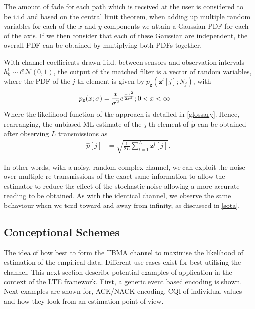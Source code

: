 \documentclass{article}
\begin{document}
The amount of fade for each path which is received at the user is considered to be i.i.d and based on the central limit theorem, when adding up multiple random variables for each of the $x$ and $y$ components we attain a Gaussian PDF for each of the axis. If we then consider that each of these Gaussian are independent, the overall PDF can be obtained by multiplying both PDFs together. 

With channel coefficients drawn \ac{i.i.d}. between sensors and observation intervals $h^l_k \sim \mathcal{CN}(0, 1)$, the output of the matched filter is a vector of random variables, where the \ac{PDF} of the $j$-th element is given by $p_{\mathbf{z}}(\boldsymbol{z}^l[j]; N_j)$, with  
%
\begin{align}
    p_{\mathbf{z}}(x; \sigma) &= \frac{x}{\sigma^2} e^{\frac{-x^2}{2\sigma^2}} ; 
    \newline 0 < x < \infty
\end{align} 
Where the likelihood function of the approach is detailed in \cref{glossary}.
Hence, rearranging, the unbiased ML estimate of the $j$-th element of $\tilde{\boldsymbol{p}}$ can be obtained after observing $L$ transmissions as
%
\begin{align}
    \hat{p}[j] &= \sqrt{\frac{1}{2L} \sum_{l = 1}^{L}\boldsymbol{z}^l[j]}.\label{eq:lte_empf_h_rand}
\end{align}

In other words, with a noisy, random complex channel, we can exploit the noise over multiple re transmissions of the exact same information to allow the estimator to reduce the effect of the stochastic noise allowing a more accurate reading to be obtained. As with the identical channel, we observe the same behaviour when we tend toward and away from infinity, as discussed in \cref{sota}.

\subsection{Conceptional Schemes} \label{schemas_and_channels}
The idea of how best to form the TBMA channel to maximise the likelihood of estimation of the empirical data. Different use cases exist for best utilising the channel. This next section describe potential examples of application in the context of the LTE framework. First, a generic event based encoding is shown. Next examples are shown for, ACK/NACK encoding, \ac{CQI} of individual values and how they look from an estimation point of view.
\end{document}
